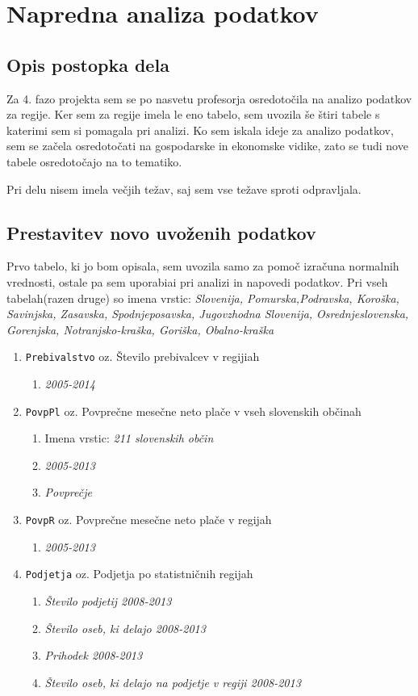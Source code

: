 \documentclass[11pt,a4paper]{article}
\begin{document}
\section{Napredna analiza podatkov}
\subsection{Opis postopka dela}
Za 4. fazo projekta sem se po nasvetu profesorja osredotočila na analizo podatkov za regije. Ker sem za regije imela le eno tabelo, sem uvozila še štiri tabele s katerimi sem si pomagala pri analizi. Ko sem iskala ideje za analizo podatkov, sem se začela osredotočati na gospodarske in ekonomske vidike, zato se tudi nove tabele osredotočajo na to tematiko.

Pri delu nisem imela večjih težav, saj sem vse težave sproti odpravljala.
\subsection{Prestavitev novo uvoženih podatkov}
Prvo tabelo, ki jo bom opisala, sem uvozila samo za pomoč izračuna normalnih vrednosti, ostale pa sem uporabiai pri analizi in napovedi podatkov. Pri vseh tabelah(razen druge) so imena vrstic: \textit{Slovenija, Pomurska,Podravska, Koroška, Savinjska, Zasavska, Spodnjeposavska, Jugovzhodna Slovenija, Osrednjeslovenska, Gorenjska, Notranjsko-kraška, Goriška, Obalno-kraška}
\begin{enumerate}
\item \verb+Prebivalstvo+ oz. Število prebivalcev v regijiah
\begin{enumerate}
\item \textit{2005-2014}
\end{enumerate}
\item \verb+PovpPl+ oz. Povprečne mesečne neto plače v vseh slovenskih občinah
\begin{enumerate}
\item Imena vrstic: \textit{211 slovenskih občin}
\item \textit{2005-2013} 
\item \textit{Povprečje} 
\end{enumerate}
\item \verb+PovpR+ oz. Povprečne mesečne neto plače v regijah
\begin{enumerate}
\item \textit{2005-2013} 
\end{enumerate}
\item \verb+Podjetja+ oz. Podjetja po statistničnih regijah
\begin{enumerate}
\item \textit{Število podjetij 2008-2013}
\item \textit{Število oseb, ki delajo 2008-2013} 
\item \textit{Prihodek 2008-2013} 
\item \textit{Število oseb, ki delajo na podjetje v regiji 2008-2013} 
\end{enumerate}
\end{enumerate}
\end{document}
